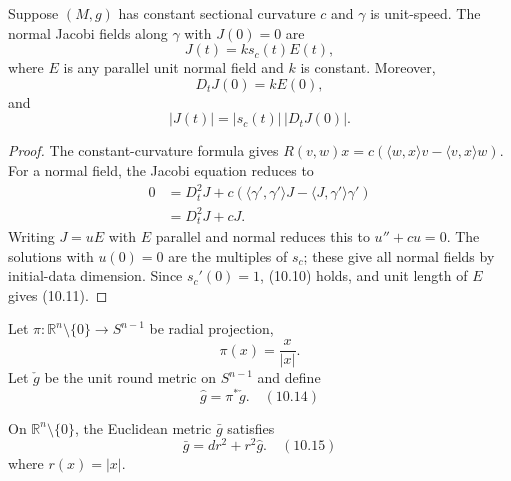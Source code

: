 \begin{proposition}
\label{prop:jacobi-constant-curvature}
Suppose $(M,g)$ has constant sectional curvature $c$ and $\gamma$ is
unit-speed.  The normal Jacobi fields along $\gamma$ with $J(0)=0$ are
\begin{equation}
J(t)=ks_c(t)E(t), \tag{10.9}
\end{equation}
where $E$ is any parallel unit normal field and $k$ is constant.  Moreover,
\begin{equation}
D_tJ(0)=kE(0), \tag{10.10}
\end{equation}
and
\begin{equation}
|J(t)|=|s_c(t)|\,|D_tJ(0)|. \tag{10.11}
\end{equation}
\end{proposition}

\begin{proof}
\sketch
The constant-curvature formula gives
$R(v,w)x=c(\langle w,x\rangle v-\langle v,x\rangle w)$.  For a normal
field, the Jacobi equation reduces to
\begin{equation}
\begin{aligned}
0&=D_t^2J+c(\langle\gamma',\gamma'\rangle J
-\langle J,\gamma'\rangle\gamma')\\
&=D_t^2J+cJ.
\end{aligned} \tag{10.12}
\end{equation}
Writing $J=uE$ with $E$ parallel and normal reduces this to
$u''+cu=0$.  The solutions with $u(0)=0$ are the multiples of $s_c$; these
give all normal fields by initial-data dimension.  Since $s_c'(0)=1$,
(10.10) holds, and unit length of $E$ gives (10.11).
\end{proof}

Let $\pi:\mathbb R^n\setminus\{0\}\to S^{n-1}$ be radial projection,
\begin{equation}
\pi(x)=\frac{x}{|x|}. \tag{10.13}
\end{equation}
Let $\check g$ be the unit round metric on $S^{n-1}$ and define
\begin{equation}
\hat g=\pi^*\check g. \quad (10.14)
\end{equation}

\begin{lemma}
\label{lem:metric-relation-euclidean}

On $\mathbb R^n\setminus\{0\}$, the Euclidean metric $\bar g$ satisfies
\begin{equation}
\bar g=dr^2+r^2\hat g. \quad (10.15)
\end{equation}
where $r(x)=|x|$.
\end{lemma}

